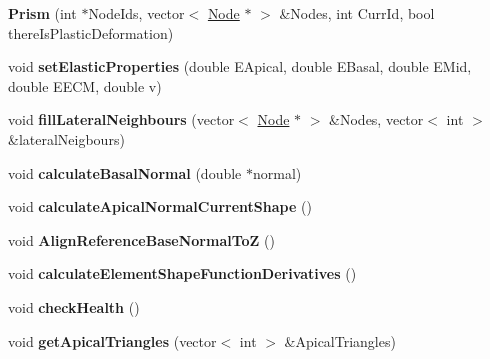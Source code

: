 \begin{DoxyCompactItemize}
\item 
\hypertarget{classPrism_a3d11803d63b24e6b62c3585c6724ab57}{}{\bfseries Prism} (int $\ast$Node\+Ids, vector$<$ \hyperlink{classNode}{Node} $\ast$ $>$ \&Nodes, int Curr\+Id, bool there\+Is\+Plastic\+Deformation)\label{classPrism_a3d11803d63b24e6b62c3585c6724ab57}

\item 
\hypertarget{classPrism_ac3f535b16518d1beea7d2405697bb203}{}void {\bfseries set\+Elastic\+Properties} (double E\+Apical, double E\+Basal, double E\+Mid, double E\+E\+C\+M, double v)\label{classPrism_ac3f535b16518d1beea7d2405697bb203}

\item 
\hypertarget{classPrism_a584a5a996dd88bdff0631da44253939e}{}void {\bfseries fill\+Lateral\+Neighbours} (vector$<$ \hyperlink{classNode}{Node} $\ast$ $>$ \&Nodes, vector$<$ int $>$ \&lateral\+Neigbours)\label{classPrism_a584a5a996dd88bdff0631da44253939e}

\item 
\hypertarget{classPrism_aa65f89d72659c92de21c411a2fa23a7e}{}void {\bfseries calculate\+Basal\+Normal} (double $\ast$normal)\label{classPrism_aa65f89d72659c92de21c411a2fa23a7e}

\item 
\hypertarget{classPrism_a7fe4a2476246f2b4f8368b61584dea58}{}void {\bfseries calculate\+Apical\+Normal\+Current\+Shape} ()\label{classPrism_a7fe4a2476246f2b4f8368b61584dea58}

\item 
\hypertarget{classPrism_a64100d877e59727ab9b7e9ad56e17cee}{}void {\bfseries Align\+Reference\+Base\+Normal\+To\+Z} ()\label{classPrism_a64100d877e59727ab9b7e9ad56e17cee}

\item 
\hypertarget{classPrism_a9a877cebf651015b88af641f1e045699}{}void {\bfseries calculate\+Element\+Shape\+Function\+Derivatives} ()\label{classPrism_a9a877cebf651015b88af641f1e045699}

\item 
\hypertarget{classPrism_af4ce210a9ba20d34b4b903e936b9dd8d}{}void {\bfseries check\+Health} ()\label{classPrism_af4ce210a9ba20d34b4b903e936b9dd8d}

\item 
\hypertarget{classPrism_ad9b04b2ad4cdedb878b4c7c0b4917a7a}{}void {\bfseries get\+Apical\+Triangles} (vector$<$ int $>$ \&Apical\+Triangles)\label{classPrism_ad9b04b2ad4cdedb878b4c7c0b4917a7a}


\end{DoxyCompactItemize}

